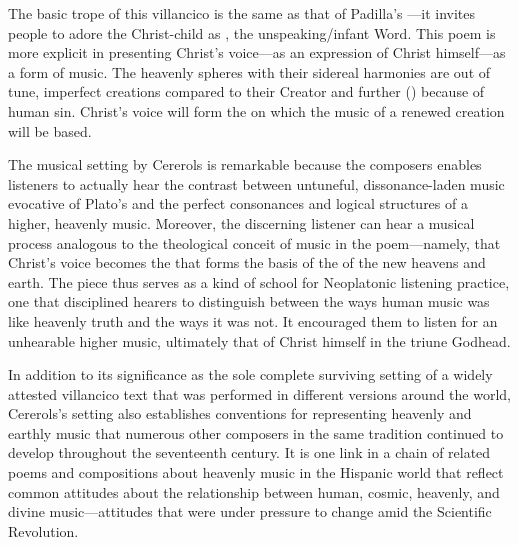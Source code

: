The basic trope of this villancico is the same as that of Padilla's
---it invites people to adore the Christ-child
as , the unspeaking/infant Word.
This poem is more explicit in presenting Christ's voice---as an expression of
Christ himself---as a form of music.
The heavenly spheres with their sidereal harmonies are out of tune, imperfect
creations compared to their Creator and further 
() because of human sin.
Christ's voice will form the  on which the music of a
renewed creation will be based.

The musical setting by Cererols is remarkable because the composers enables
listeners to actually hear the contrast between untuneful, dissonance-laden
music evocative of Plato's  and the perfect
consonances and logical structures of a higher, heavenly music.
Moreover, the discerning listener can hear a musical process analogous to the
theological conceit of music in the poem---namely, that Christ's voice becomes
the  that forms the basis of the  of the
new heavens and earth.
The piece thus serves as a kind of school for Neoplatonic listening practice,
one that disciplined hearers to distinguish between the ways human music was
like heavenly truth and the ways it was not.
It encouraged them to listen for an unhearable higher music, ultimately that of
Christ himself in the triune Godhead.

In addition to its significance as the sole complete surviving setting of a
widely attested villancico text that was performed in different versions around
the world, Cererols's setting also establishes conventions for representing
heavenly and earthly music that numerous other composers in the same tradition
continued to develop throughout the seventeenth century. 
It is one link in a chain of related poems and compositions about heavenly music
in the Hispanic world that reflect common attitudes about the relationship
between human, cosmic, heavenly, and divine music---attitudes that were under
pressure to change amid the Scientific Revolution.

